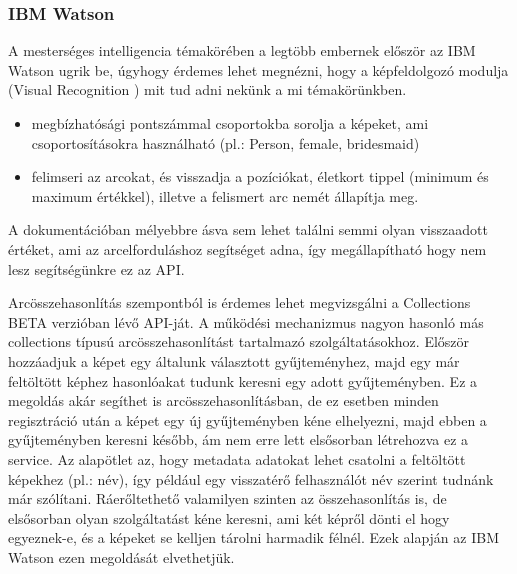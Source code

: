 \subsubsection{IBM Watson}
A mesterséges intelligencia témakörében a legtöbb embernek először az IBM Watson ugrik be, úgyhogy érdemes lehet megnézni, hogy a képfeldolgozó modulja (Visual Recognition \cite{IBMWatson}) mit tud adni nekünk a mi témakörünkben. 
\begin{itemize}
\item megbízhatósági pontszámmal csoportokba sorolja a képeket, ami csoportosításokra használható (pl.: Person, female, bridesmaid)
\item felimseri az arcokat, és visszadja a pozíciókat, életkort tippel (minimum és maximum értékkel), illetve a felismert arc nemét állapítja meg.
\end{itemize}

A dokumentációban\cite{WATSON_DETECT} mélyebbre ásva sem lehet találni semmi olyan visszaadott értéket, ami az arcelforduláshoz segítséget adna, így megállapítható hogy nem lesz segítségünkre ez az API.

Arcösszehasonlítás szempontból is érdemes lehet megvizsgálni a Collections BETA\cite{WATSON_COLLECTIONS} verzióban lévő API-ját. A működési mechanizmus nagyon hasonló más collections típusú arcösszehasonlítást tartalmazó szolgáltatásokhoz. Először hozzáadjuk a képet egy általunk választott gyűjteményhez, majd egy már feltöltött képhez hasonlóakat tudunk keresni egy adott gyűjteményben. Ez a megoldás akár segíthet is arcösszehasonlításban, de ez esetben minden regisztráció után a képet egy új gyűjteményben kéne elhelyezni, majd ebben a gyűjteményben keresni később, ám nem erre lett elsősorban létrehozva ez a service. Az alapötlet az, hogy metadata adatokat lehet csatolni a feltöltött képekhez (pl.: név), így például egy visszatérő felhasználót név szerint tudnánk már szólítani. Ráerőltethető valamilyen szinten az összehasonlítás is, de elsősorban olyan szolgáltatást kéne keresni, ami két képről dönti el hogy egyeznek-e, és a képeket se kelljen tárolni harmadik félnél. Ezek alapján az IBM Watson ezen megoldását elvethetjük.

